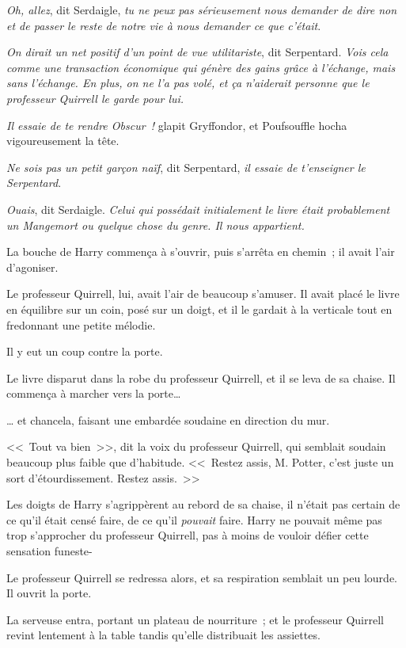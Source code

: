 \emph{Oh, allez}, dit Serdaigle, \emph{tu ne peux pas sérieusement nous demander de dire non et de passer le reste de notre vie à nous demander ce que c'était}.

\emph{On dirait un net positif d'un point de vue utilitariste}, dit Serpentard. \emph{Vois cela comme une transaction économique qui génère des gains grâce à l'échange, mais sans l'échange. En plus, on ne l'a pas volé, et ça n'aiderait personne que le professeur Quirrell le garde pour lui.}

\emph{Il essaie de te rendre Obscur~!} glapit Gryffondor, et Poufsouffle hocha vigoureusement la tête.

\emph{Ne sois pas un petit garçon naïf}, dit Serpentard, \emph{il essaie de t'enseigner le Serpentard}.

\emph{Ouais}, dit Serdaigle. \emph{Celui qui possédait initialement le livre était probablement un Mangemort ou quelque chose du genre. Il nous appartient.}

La bouche de Harry commença à s'ouvrir, puis s'arrêta en chemin~; il avait l'air d'agoniser.

Le professeur Quirrell, lui, avait l'air de beaucoup s'amuser. Il avait placé le livre en équilibre sur un coin, posé sur un doigt, et il le gardait à la verticale tout en fredonnant une petite mélodie.

Il y eut un coup contre la porte.

Le livre disparut dans la robe du professeur Quirrell, et il se leva de sa chaise. Il commença à marcher vers la porte…

… et chancela, faisant une embardée soudaine en direction du mur.

<<~Tout va bien~>>, dit la voix du professeur Quirrell, qui semblait soudain beaucoup plus faible que d'habitude. <<~Restez assis, M. Potter, c'est juste un sort d'étourdissement. Restez assis.~>>

Les doigts de Harry s'agrippèrent au rebord de sa chaise, il n'était pas certain de ce qu'il était censé faire, de ce qu'il \emph{pouvait} faire. Harry ne pouvait même pas trop s'approcher du professeur Quirrell, pas à moins de vouloir défier cette sensation funeste-

Le professeur Quirrell se redressa alors, et sa respiration semblait un peu lourde. Il ouvrit la porte.

La serveuse entra, portant un plateau de nourriture~; et le professeur Quirrell revint lentement à la table tandis qu'elle distribuait les assiettes.

